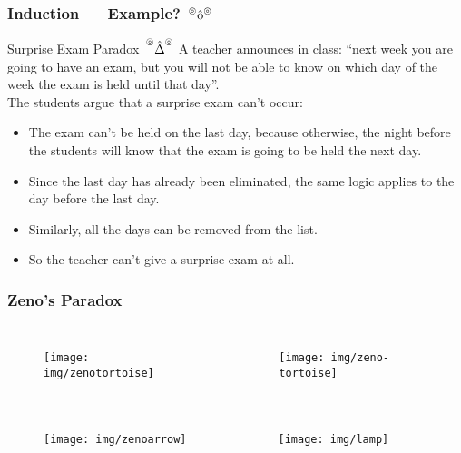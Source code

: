\documentclass[UTF8,aspectratio=43,11pt,colorlinks,compress,openany]{beamer}%
\begin{document}
\begin{frame}\frametitle{Induction --- Example? $\sideset{^\circledcirc}{^\circledcirc}{\operatorname{\hat{o}}}$}
	\begin{block}{Surprise Exam Paradox $\sideset{^{\circledcirc}}{^{\circledcirc}}{\operatorname{\hat{\Delta}}}$}
		A teacher announces in class: ``next week you are going to have an exam, but you will not be able to know on which day of the week the exam is held until that day''.\\
		The students argue that a surprise exam can't occur:
		\begin{itemize}
			\item The exam can't be held on the last day, because otherwise, the night before the students will know that the exam is going to be held the next day.
			\item Since the last day has already been eliminated, the same logic applies to the day before the last day.
			\item Similarly, all the days can be removed from the list.
			\item So the teacher can't give a surprise exam at all.
		\end{itemize}
	\end{block}
\end{frame}

\begin{frame}\frametitle{Zeno's Paradox}\vspace{-5pt}
	\begin{columns}
			\begin{figure}
				\texttt{[image: img/zenotortoise]}
			\end{figure}
			\begin{figure}
				\texttt{[image: img/zeno-tortoise]}
			\end{figure}
	\end{columns}\vspace{-8pt}
	\begin{columns}
			\begin{figure}
				\texttt{[image: img/zenoarrow]}
			\end{figure}
			\begin{figure}
				\texttt{[image: img/lamp]}
			\end{figure}
	\end{columns}
\end{frame}
\end{document}
